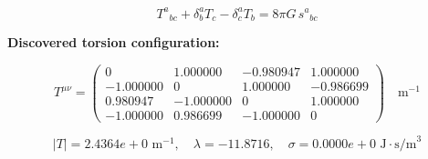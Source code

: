 
\begin{equation}
  T^a{}_{bc} + \delta^a_b T_c - \delta^a_c T_b = 8\pi G \, s^a{}_{bc}
\end{equation}

\textbf{Discovered torsion configuration:}

\begin{equation}
  T^{\mu\nu} = \begin{pmatrix}
    0 & 1.000000 & -0.980947 & 1.000000 \\
    -1.000000 & 0 & 1.000000 & -0.986699 \\
    0.980947 & -1.000000 & 0 & 1.000000 \\
    -1.000000 & 0.986699 & -1.000000 & 0
  \end{pmatrix} \quad \text{m}^{-1}
\end{equation}

\begin{equation}
  |T| = 2.4364e+0 \text{ m}^{-1}, \quad
  \lambda = -11.8716, \quad
  \sigma = 0.0000e+0 \text{ J}\cdot\text{s/m}^3
\end{equation}